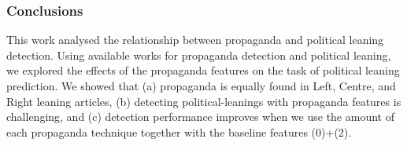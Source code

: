 


\subsubsection{Conclusions}

This work analysed the relationship between propaganda and political leaning detection. Using available works for propaganda detection and political leaning, we explored the effects of the propaganda features on the task of political leaning prediction. We showed that (a) propaganda is equally found in Left, Centre, and Right leaning articles, (b) detecting political-leanings with propaganda features is challenging, and (c) detection performance improves when we use the amount of each propaganda technique together with the baseline features (0)+(2).


